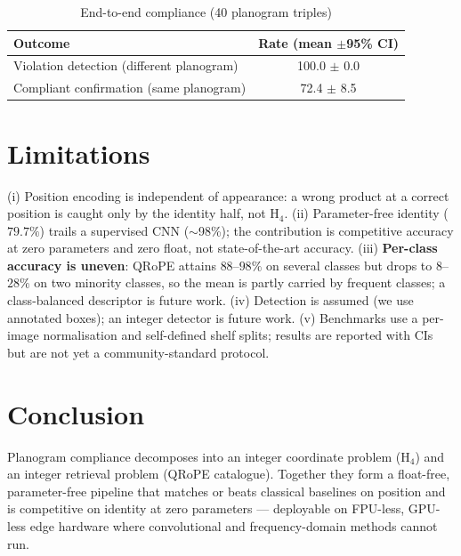 \documentclass[10pt,journal,compsoc]{IEEEtran}
\begin{document}
\begin{table}[t]\caption{End-to-end compliance (40 planogram triples)}\label{tab:e2e}\centering
\begin{tabular}{lc}\toprule
Outcome & Rate (mean $\pm$95\% CI)\\\midrule
Violation detection (different planogram) & 100.0 $\pm$ 0.0\\
Compliant confirmation (same planogram) & 72.4 $\pm$ 8.5\\
\bottomrule\end{tabular}\end{table}

\FloatBarrier
\section{Limitations}\label{sec:lim}
(i) Position encoding is independent of appearance: a wrong product at a correct
position is caught only by the identity half, not H$_4$. (ii) Parameter-free
identity ($79.7\%$) trails a supervised CNN ($\sim$98\%); the contribution is
competitive accuracy at zero parameters and zero float, not state-of-the-art
accuracy. (iii) \textbf{Per-class accuracy is uneven}: QRoPE attains $88$--$98\%$ on
several classes but drops to $8$--$28\%$ on two minority classes, so the mean is
partly carried by frequent classes; a class-balanced descriptor is future work.
(iv) Detection is assumed (we use annotated boxes); an integer detector is future
work. (v) Benchmarks use a per-image normalisation and self-defined shelf splits;
results are reported with CIs but are not yet a community-standard protocol.

\section{Conclusion}
Planogram compliance decomposes into an integer coordinate problem (H$_4$) and an
integer retrieval problem (QRoPE catalogue). Together they form a float-free,
parameter-free pipeline that matches or beats classical baselines on position and is
competitive on identity at zero parameters --- deployable on FPU-less, GPU-less edge
hardware where convolutional and frequency-domain methods cannot run.
\end{document}
